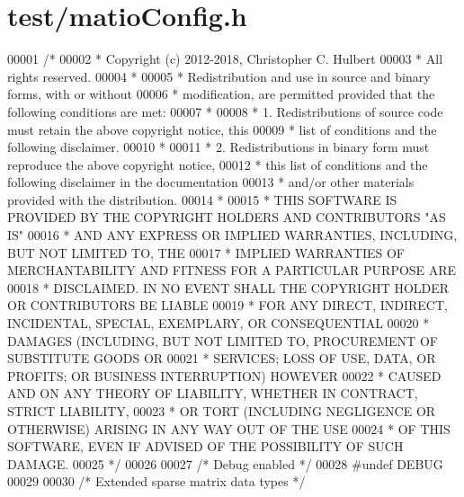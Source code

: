 \hypertarget{test_2matio_config_8h_source}{}\section{test/matio\+Config.h}
\label{test_2matio_config_8h_source}

\begin{DoxyCode}
00001 \textcolor{comment}{/*}
00002 \textcolor{comment}{ * Copyright (c) 2012-2018, Christopher C. Hulbert}
00003 \textcolor{comment}{ * All rights reserved.}
00004 \textcolor{comment}{ *}
00005 \textcolor{comment}{ * Redistribution and use in source and binary forms, with or without}
00006 \textcolor{comment}{ * modification, are permitted provided that the following conditions are met:}
00007 \textcolor{comment}{ *}
00008 \textcolor{comment}{ * 1. Redistributions of source code must retain the above copyright notice, this}
00009 \textcolor{comment}{ *    list of conditions and the following disclaimer.}
00010 \textcolor{comment}{ *}
00011 \textcolor{comment}{ * 2. Redistributions in binary form must reproduce the above copyright notice,}
00012 \textcolor{comment}{ *    this list of conditions and the following disclaimer in the documentation}
00013 \textcolor{comment}{ *    and/or other materials provided with the distribution.}
00014 \textcolor{comment}{ *}
00015 \textcolor{comment}{ * THIS SOFTWARE IS PROVIDED BY THE COPYRIGHT HOLDERS AND CONTRIBUTORS "AS IS"}
00016 \textcolor{comment}{ * AND ANY EXPRESS OR IMPLIED WARRANTIES, INCLUDING, BUT NOT LIMITED TO, THE}
00017 \textcolor{comment}{ * IMPLIED WARRANTIES OF MERCHANTABILITY AND FITNESS FOR A PARTICULAR PURPOSE ARE}
00018 \textcolor{comment}{ * DISCLAIMED. IN NO EVENT SHALL THE COPYRIGHT HOLDER OR CONTRIBUTORS BE LIABLE}
00019 \textcolor{comment}{ * FOR ANY DIRECT, INDIRECT, INCIDENTAL, SPECIAL, EXEMPLARY, OR CONSEQUENTIAL}
00020 \textcolor{comment}{ * DAMAGES (INCLUDING, BUT NOT LIMITED TO, PROCUREMENT OF SUBSTITUTE GOODS OR}
00021 \textcolor{comment}{ * SERVICES; LOSS OF USE, DATA, OR PROFITS; OR BUSINESS INTERRUPTION) HOWEVER}
00022 \textcolor{comment}{ * CAUSED AND ON ANY THEORY OF LIABILITY, WHETHER IN CONTRACT, STRICT LIABILITY,}
00023 \textcolor{comment}{ * OR TORT (INCLUDING NEGLIGENCE OR OTHERWISE) ARISING IN ANY WAY OUT OF THE USE}
00024 \textcolor{comment}{ * OF THIS SOFTWARE, EVEN IF ADVISED OF THE POSSIBILITY OF SUCH DAMAGE.}
00025 \textcolor{comment}{ */}
00026 
00027 \textcolor{comment}{/* Debug enabled */}
00028 \textcolor{preprocessor}{#undef DEBUG}
00029 
00030 \textcolor{comment}{/* Extended sparse matrix data types */}

\end{DoxyCode}
